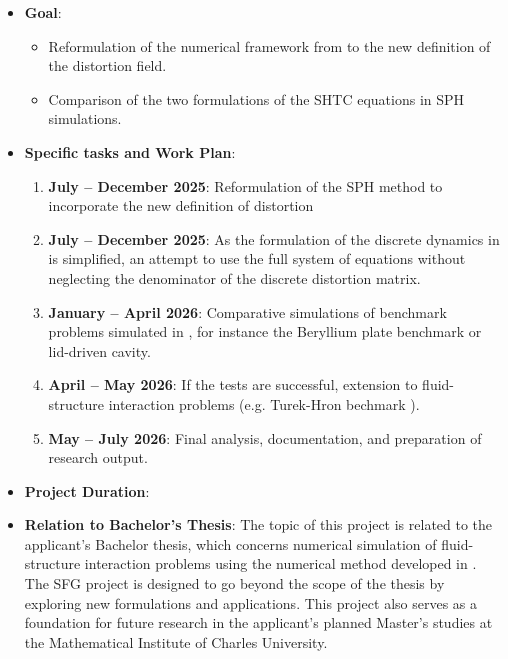 \documentclass[oneside, a4paper, onecolumn, 11pt]{article}
\newenvironment{itemize*}%
  {\begin{itemize}%
    \setlength{\itemsep}{0pt}%
    \setlength{\parskip}{0pt}}%
  {\end{itemize}}
\begin{document}
\begin{itemize}
If the numerical SPH-based method becomes compatible with the new definition, it would be possible to simulate nanomembranes and other nanomaterials, where fluctuations play an important role, by the method. 

	\item \textbf{Goal}: 
	\begin{itemize}
	\item Reformulation of the numerical framework from \cite{kincl-unified} to the new definition of the distortion field.
	\item Comparison of the two formulations of the SHTC equations in SPH simulations.
	\end{itemize}


\item \textbf{Specific tasks and Work Plan}: 
\begin{enumerate}
\item \textbf{July – December 2025}: %
Reformulation of the SPH method to incorporate the new definition of distortion
\item \textbf{July – December 2025}: As the formulation of the discrete dynamics in \cite{kincl-unified} is simplified, an attempt to use the full system of equations without neglecting the denominator of the discrete distortion matrix.

\item \textbf{January – April 2026}: Comparative simulations of benchmark problems simulated in \cite{kincl-unified}, for instance the Beryllium plate benchmark or lid-driven cavity. 
\item \textbf{April – May 2026}: If the tests are successful, extension to fluid-structure interaction problems
(e.g. Turek-Hron bechmark \cite{turek-hron}).

\item \textbf{May – July 2026}: Final analysis, documentation, and preparation of research output.
\end{enumerate}

\item \textbf{Project Duration}:

\item \textbf{Relation to Bachelor’s Thesis}:
The topic of this project is related to the applicant's Bachelor thesis, which concerns numerical simulation of
fluid-structure interaction problems using the numerical method developed in \cite{kincl-unified}.
The SFG project is designed to go beyond the scope of the thesis by exploring new formulations and applications.
This project also serves as a foundation for future research in the applicant’s planned Master’s studies at the Mathematical Institute of Charles University.



\end{itemize}
\end{document}
